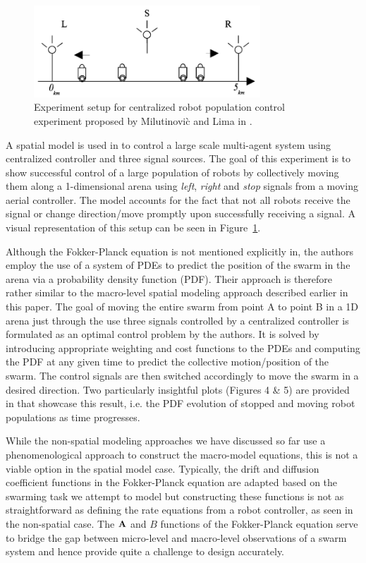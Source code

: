 \documentclass[Main.tex]{subfiles}
\begin{document}
\begin{figure}[!ht]
\centering\includegraphics[width=8.5cm]{assets/spatSignal.png}
\centering\caption{Experiment setup for centralized robot population control experiment proposed by Milutinovi\`{c} and Lima in%
.}\label{fig:signal}
\end{figure}

A spatial model is used in\citep{Milutinovi2006} to control a large scale multi-agent system using centralized controller and three signal sources. The goal of this experiment is to show successful control of a large population of robots by collectively moving them along a 1-dimensional arena using \emph{left}, \emph{right} and \emph{stop} signals from a moving aerial controller. The model accounts for the fact that not all robots receive the signal or change direction/move promptly upon successfully receiving a signal. A visual representation of this setup can be seen in Figure~\ref{fig:signal}.

Although the Fokker-Planck equation is not mentioned explicitly in\citep{Milutinovi2006}, the authors employ the use of a system of PDEs to predict the position of the swarm in the arena via a probability density function (PDF). Their approach is therefore rather similar to the macro-level spatial modeling approach described earlier in this paper. The goal of moving the entire swarm  from point A to point B in a 1D arena just through the use three signals controlled by a centralized controller is formulated as an optimal control problem by the authors. It is solved by introducing appropriate weighting and cost functions to the PDEs and computing the PDF at any given time to predict the collective motion/position of the swarm. The control signals are then switched accordingly to move the swarm in a desired direction. Two particularly insightful plots (Figures 4 \& 5) are provided in\citep{Milutinovi2006} that showcase this result, i.e. the PDF evolution of stopped and moving robot populations as time progresses.

While the non-spatial modeling approaches we have discussed so far use a phenomenological approach to construct the macro-model equations, this is not a viable option in the spatial model case. Typically, the drift and diffusion coefficient functions in the Fokker-Planck equation are adapted based on the swarming task we attempt to model but constructing these functions is not as straightforward as defining the rate equations from a robot controller, as seen in the non-spatial case. The $\mathbf{A}$ and $B$ functions of the Fokker-Planck equation serve to bridge the gap between micro-level and macro-level observations of a swarm system and hence provide quite a challenge to design accurately.
\end{document}
